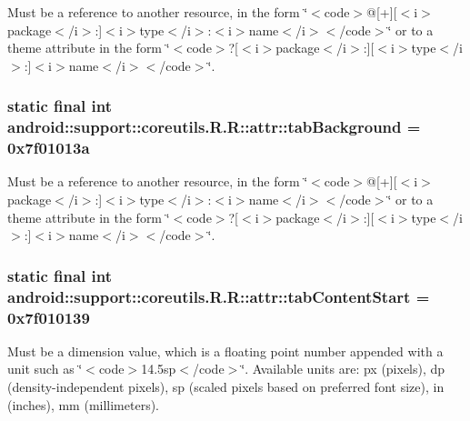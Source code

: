Must be a reference to another resource, in the form \char`\"{}$<$code$>$@\mbox{[}+\mbox{]}\mbox{[}$<$i$>$package$<$/i$>$:\mbox{]}$<$i$>$type$<$/i$>$:$<$i$>$name$<$/i$>$$<$/code$>$\char`\"{} or to a theme attribute in the form \char`\"{}$<$code$>$?\mbox{[}$<$i$>$package$<$/i$>$:\mbox{]}\mbox{[}$<$i$>$type$<$/i$>$:\mbox{]}$<$i$>$name$<$/i$>$$<$/code$>$\char`\"{}. \hypertarget{classandroid_1_1support_1_1coreutils_1_1_r_1_1attr_3dca9b897843b4b59a01f3ad3595b9ef}{
\subsubsection[{tabBackground}]{\setlength{\rightskip}{0pt plus 5cm}static final int android::support::coreutils.R.R::attr::tabBackground = 0x7f01013a}}
\label{classandroid_1_1support_1_1coreutils_1_1_r_1_1attr_3dca9b897843b4b59a01f3ad3595b9ef}


Must be a reference to another resource, in the form \char`\"{}$<$code$>$@\mbox{[}+\mbox{]}\mbox{[}$<$i$>$package$<$/i$>$:\mbox{]}$<$i$>$type$<$/i$>$:$<$i$>$name$<$/i$>$$<$/code$>$\char`\"{} or to a theme attribute in the form \char`\"{}$<$code$>$?\mbox{[}$<$i$>$package$<$/i$>$:\mbox{]}\mbox{[}$<$i$>$type$<$/i$>$:\mbox{]}$<$i$>$name$<$/i$>$$<$/code$>$\char`\"{}. \hypertarget{classandroid_1_1support_1_1coreutils_1_1_r_1_1attr_7ac66c6ab6b2d2bca042b800731a06b3}{
\subsubsection[{tabContentStart}]{\setlength{\rightskip}{0pt plus 5cm}static final int android::support::coreutils.R.R::attr::tabContentStart = 0x7f010139}}
\label{classandroid_1_1support_1_1coreutils_1_1_r_1_1attr_7ac66c6ab6b2d2bca042b800731a06b3}


Must be a dimension value, which is a floating point number appended with a unit such as \char`\"{}$<$code$>$14.5sp$<$/code$>$\char`\"{}. Available units are: px (pixels), dp (density-independent pixels), sp (scaled pixels based on preferred font size), in (inches), mm (millimeters). 

